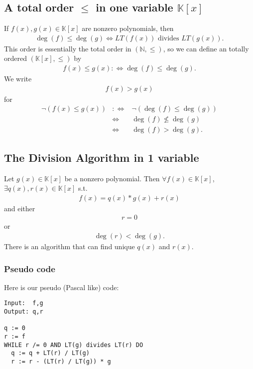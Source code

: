 \documentclass[11pt]{book}
\begin{document}
\subsection{A total order $\leq$ in one variable $ \mathbb{K}[x]$ }
If $f(x), g(x) \in \mathbb{K}[x]$ are nonzero polynomials, then
\begin{eqnarray}
\deg(f) \leq \deg(g) \Leftrightarrow LT\left(f(x) \right) \text{ divides } LT\left(g(x) \right).
\end{eqnarray}
This order is essentially the total order in $(\mathbb{N}, \leq)$, so we can define an totally ordered $(\mathbb{K}[x], \leq)$ by
\begin{eqnarray}
f(x) \leq g(x) :\Leftrightarrow \deg(f) \leq \deg(g).
\end{eqnarray}
We write
\begin{eqnarray}
f(x) > g(x)
\end{eqnarray}
for
\begin{eqnarray}
\lnot\left( f(x) \leq g(x) \right) &:\Leftrightarrow& \lnot\left( \deg(f) \leq \deg(g) \right) \\
&\Leftrightarrow&  \deg(f) \not\leq \deg(g) \\
&\Leftrightarrow&  \deg(f) > \deg(g).
\end{eqnarray}

\subsection{The Division Algorithm in 1 variable}
\label{DivisionAlgorithmIn1}
Let $g(x) \in \mathbb{K}[x]$ be a nonzero polynomial.
Then $\forall f(x) \in \mathbb{K}[x]$, $\exists q(x),r(x) \in \mathbb{K}[x]$ s.t.
\begin{eqnarray}
f(x) = q(x)*g(x) + r(x)
\end{eqnarray}
and either
\begin{eqnarray}
r = 0
\end{eqnarray}
or
\begin{eqnarray}
\label{degreeOfReminder}
\deg(r) < \deg(g).
\end{eqnarray}
There is an algorithm that can find unique $q(x)$ and $r(x)$.

\subsubsection{Pseudo code}
Here is our pseudo (Pascal like) code:
\begin{verbatim}
Input:  f,g
Output: q,r

q := 0
r := f
WHILE r /= 0 AND LT(g) divides LT(r) DO
  q := q + LT(r) / LT(g)
  r := r - (LT(r) / LT(g)) * g
\end{verbatim}
\end{document}

